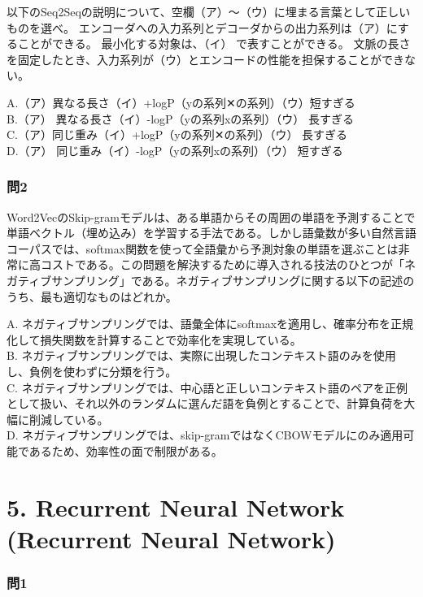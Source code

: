 \documentclass[
  letterpaper,
  DIV=11,
  numbers=noendperiod]{scrreprt}
\begin{document}
以下のSeq2Seqの説明について、空欄（ア）～（ウ）に埋まる言葉として正しいものを選べ。
エンコーダへの入力系列とデコーダからの出力系列は（ア）にすることができる。
最小化する対象は、（イ） で表すことができる。
文脈の長さを固定したとき、入力系列が（ウ）とエンコードの性能を担保することができない。

A.（ア）異なる長さ（イ）+logP（yの系列\textbar✕の系列）（ウ）短すぎる\\
B.（ア） 異なる長さ（イ）-logP（yの系列\textbar xの系列）（ウ）
長すぎる\\
C.（ア）同じ重み（イ）+logP（yの系列\textbar✕の系列）（ウ） 長すぎる\\
D.（ア） 同じ重み（イ）-logP（yの系列xの系列）（ウ） 短すぎる

\subsection{問2}\label{ux554f2-1}

Word2VecのSkip-gramモデルは、ある単語からその周囲の単語を予測することで単語ベクトル（埋め込み）を学習する手法である。しかし語彙数が多い自然言語コーパスでは、softmax関数を使って全語彙から予測対象の単語を選ぶことは非常に高コストである。この問題を解決するために導入される技法のひとつが「ネガティブサンプリング」である。ネガティブサンプリングに関する以下の記述のうち、最も適切なものはどれか。

A.
ネガティブサンプリングでは、語彙全体にsoftmaxを適用し、確率分布を正規化して損失関数を計算することで効率化を実現している。\\
B.
ネガティブサンプリングでは、実際に出現したコンテキスト語のみを使用し、負例を使わずに分類を行う。\\
C.
ネガティブサンプリングでは、中心語と正しいコンテキスト語のペアを正例として扱い、それ以外のランダムに選んだ語を負例とすることで、計算負荷を大幅に削減している。\\
D.
ネガティブサンプリングでは、skip-gramではなくCBOWモデルにのみ適用可能であるため、効率性の面で制限がある。

\chapter{5. Recurrent Neural Network (Recurrent Neural
Network)}\label{recurrent-neural-network-recurrent-neural-network}

\subsection{問1}\label{ux554f1-3}
\end{document}
